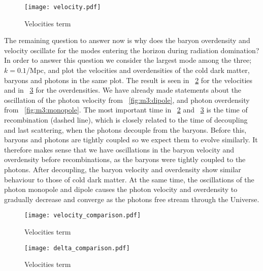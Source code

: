 
    \begin{figure}
        \texttt{[image: velocity.pdf]}
        \caption{Velocities term}
        \label{fig:m3:velocity}
    \end{figure}

    The remaining question to answer now is why does the baryon overdensity and velocity oscillate for the modes entering the horizon during radiation domination? In order to answer this question we consider the largest mode among the three; $k=0.1$/Mpc, and plot the velocities and overdensities of the cold dark matter, baryons and photons in the same plot. The result is seen in ~\cref{fig:m3:velocity_comparison} for the velocities and in ~\cref{fig:m3:delta_comparison} for the overdensities. We have already made statements about the oscillation of the photon velocity from ~\cref{fig:m3:dipole}, and photon overdensity from ~\cref{fig:m3:monopole}. The most important time in ~\cref{fig:m3:velocity_comparison} and ~\cref{fig:m3:delta_comparison} is the time of recombination (dashed line), which is closely related to the time of decoupling and last scattering, when the photons decouple from the baryons. Before this, baryons and photons are tightly coupled so we expect them to evolve similarly. It therefore makes sense that we have oscillations in the baryon velocity and overdensity before recombinations, as the baryons were tightly coupled to the photons. After decoupling, the baryon velocity and overdensity show similar behaviour to those of cold dark matter. At the same time, the oscillations of the photon monopole and dipole causes the photon velocity and overdensity to gradually decrease and converge as the photons free stream through the Universe. 

    \begin{figure}
        \texttt{[image: velocity\_comparison.pdf]}
        \caption{Velocities term}
        \label{fig:m3:velocity_comparison}
    \end{figure}

    \begin{figure}
        \texttt{[image: delta\_comparison.pdf]}
        \caption{Velocities term}
        \label{fig:m3:delta_comparison}
    \end{figure}

